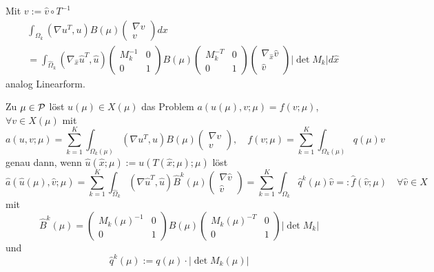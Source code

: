 \begin{itemize}
		Mit $v := \hat v \circ T^{-1}$
		\begin{align*}
			&\int_{\Omega_k} (\nabla u^T, u) B(\mu) \begin{pmatrix} \nabla v \\ v \end{pmatrix} dx\\
			&= \int_{\hat\Omega_k} (\nabla_{\hat x} \hat u^T, \hat u) \begin{pmatrix} M_k^{-1} & 0 \\ 0 & 1 \end{pmatrix} B(\mu) \begin{pmatrix} M_k^{-T} & 0 \\ 0 & 1 \end{pmatrix} \begin{pmatrix} \nabla_{\hat x} \hat v \\ \hat v \end{pmatrix} |\det M_k| d \hat x
		\end{align*}
		analog Linearform.
\end{itemize}

\begin{satz}
	Zu $\mu \in \mathcal{P}$ löst $u(\mu) \in X(\mu)$ das Problem $a(u(\mu),v;\mu) = f(v;\mu)$, $\forall v \in X(\mu)$ mit
	\[
		a(u,v;\mu) = \sum_{k=1}^K \int_{\Omega_k(\mu)} (\nabla u^T, u) B(\mu) \begin{pmatrix} \nabla v \\ v \end{pmatrix}, \quad f(v;\mu) = \sum_{k=1}^{K} \int_{\Omega_k(\mu)} q(\mu) v
	\]
	genau dann, wenn $\hat u(\hat x; \mu) := u(T(\hat x;\mu);\mu)$ löst
	\[
		\hat a(\hat u(\mu), \hat v; \mu) = \sum_{k=1}^{K} \int_{\hat \Omega_k} (\nabla \hat u^T, \hat u) \hat B^k(\mu) \begin{pmatrix} \nabla \hat v \\ \hat v \end{pmatrix} = \sum_{k=1}^K \int_{\Omega_k} \hat q^k(\mu) \hat v =: \hat f(\hat v; \mu) \quad \forall \hat v \in \hat X
	\]
	mit
	\[
		\hat B^k(\mu) = \begin{pmatrix} M_k(\mu)^{-1} & 0 \\ 0 & 1 \end{pmatrix} B(\mu) \begin{pmatrix} M_k(\mu)^{-T} & 0 \\ 0 & 1 \end{pmatrix} |\det M_k|
	\]
	und
	\[
		\hat q^k(\mu) := q(\mu) \cdot |\det M_k(\mu)|
	\]
\end{satz}

